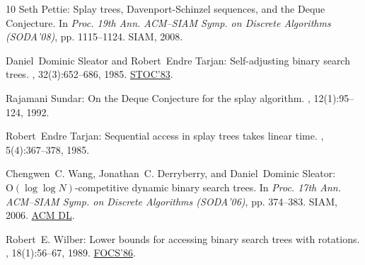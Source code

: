 \documentclass[11pt]{article}
\numberwithin{equation}{section}
\theoremstyle{definition}
\theoremstyle{plain}
\begin{document}
\begin{thebibliography}{10}
{\sc Seth Pettie}: Splay trees, {D}avenport-{S}chinzel sequences, and the
  {D}eque {C}onjecture.
\newblock In {\em Proc. 19th Ann. ACM--SIAM Symp. on Discrete Algorithms
  (SODA'08)}, pp. 1115--1124. SIAM, 2008.

{\sc Daniel~Dominic Sleator and Robert~Endre Tarjan}: Self-adjusting binary
  search trees.
, 32(3):652--686, 1985.
\newblock \prelim \href{https://doi.org/10.1145/800061.808752}{STOC'83}.
\newblock [\epfmtdoi{10.1145/3828.3835}]

{\sc Rajamani Sundar}: On the {D}eque {C}onjecture for the splay algorithm.
, 12(1):95--124, 1992.
\newblock [\epfmtdoi{10.1007/BF01191208}]

{\sc Robert~Endre Tarjan}: Sequential access in splay trees takes linear time.
, 5(4):367--378, 1985.
\newblock [\epfmtdoi{10.1007/BF02579253}]

{\sc Chengwen~C. Wang, Jonathan~C. Derryberry, and Daniel~Dominic Sleator}:
  {$\mathrm{O}(\log \log N)$}-competitive dynamic binary search trees.
\newblock In {\em Proc. 17th Ann. ACM--SIAM Symp. on Discrete Algorithms
  (SODA'06)}, pp. 374--383. SIAM, 2006.
\newblock \href{https://dl.acm.org/doi/10.5555/1109557.1109600}{ACM DL}.

{\sc Robert~E. Wilber}: Lower bounds for accessing binary search trees with
  rotations.
, 18(1):56--67, 1989.
\newblock \prelim \href{https://doi.org/10.1109/SFCS.1986.28}{FOCS'86}.
\newblock [\epfmtdoi{10.1137/0218004}]

\end{thebibliography}
\end{document}
